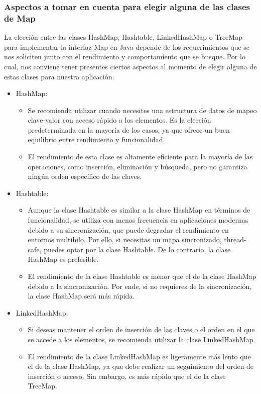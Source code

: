 \documentclass{report}
\begin{document}
\subsubsection{Aspectos a tomar en cuenta para elegir alguna de las clases de Map}
La elección entre las clases HashMap, Hashtable, LinkedHashMap o TreeMap para implementar la interfaz Map en Java depende de los requerimientos que se nos soliciten junto con el rendimiento y comportamiento que se busque. Por lo cual, nos conviene tener presentes ciertos aspectos al momento de elegir alguna de estas clases para nuestra aplicación.
\begin{itemize}
    \item HashMap:
    \begin{itemize}
    \item Se recomienda utilizar cuando necesites una estructura de datos de mapeo clave-valor con acceso rápido a los elementos. Es la elección predeterminada en la mayoría de los casos, ya que ofrece un buen equilibrio entre rendimiento y funcionalidad.
    \item El rendimiento de esta clase es altamente eficiente para la mayoría de las operaciones, como inserción, eliminación y búsqueda, pero no garantiza ningún orden específico de las claves.
    \end{itemize}
    \item Hashtable:
    \begin{itemize}
    \item Aunque la clase Hashtable es similar a la clase HashMap en términos de funcionalidad, se utiliza con menos frecuencia en aplicaciones modernas debido a su sincronización, que puede degradar el rendimiento en entornos multihilo. Por ello, si necesitas un mapa sincronizado, thread-safe, puedes optar por la clase Hashtable. De lo contrario, la clase HashMap es preferible.
    \item El rendimiento de la clase Hashtable es menor que el de la clase HashMap debido a la sincronización. Por ende, si no requieres de la sincronización, la clase HashMap será más rápida.
    \end{itemize}
    \item LinkedHashMap:
    \begin{itemize}
    \item Si deseas mantener el orden de inserción de las claves o el orden en el que se accede a los elementos, se recomienda utilizar la clase LinkedHashMap.
    \item El rendimiento de la clase LinkedHashMap es ligeramente más lento que el de la clase HashMap, ya que debe realizar un seguimiento del orden de inserción o acceso. Sin embargo, es más rápido que el de la clase TreeMap.

\end{itemize}
\end{itemize}
\end{document}

